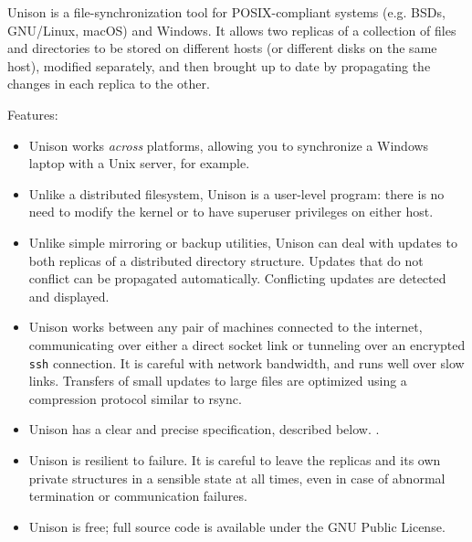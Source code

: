 Unison is a file-synchronization tool for POSIX-compliant systems (e.g. BSDs,
GNU/Linux, macOS) and Windows.  It allows two replicas of a collection of files
and directories to be stored on different hosts (or different disks on the same
host), modified separately, and then brought up to date by propagating the
changes in each replica to the other.

Features:
\begin{itemize}
\item Unison works {\em across} platforms, allowing you to synchronize a
  Windows laptop with a Unix server, for example.
\item Unlike a distributed filesystem, Unison is a user-level program:
  there is no need to modify the kernel or to have
  superuser privileges on either host.
\item Unlike simple mirroring or backup utilities, Unison can deal
  with updates to both replicas of a distributed directory structure.
  Updates that do not conflict can be propagated automatically.
  Conflicting updates are detected and displayed.
\item Unison works between any pair of machines connected to the
  internet, communicating over either a direct socket link or
  tunneling over an encrypted {\tt ssh} connection.
  It is careful with network bandwidth, and runs well over slow links.
  Transfers of small updates to large files are optimized using a compression
  protocol similar to rsync.
\item Unison has a clear and precise specification\iffull, described
below. \else. \fi
  \item Unison is resilient to failure.  It is careful to leave the
  replicas and its own private structures in a sensible state at all
  times, even in case of abnormal termination or communication
  failures.
\item Unison is free; full source code is available under the GNU
Public License.
\end{itemize}
